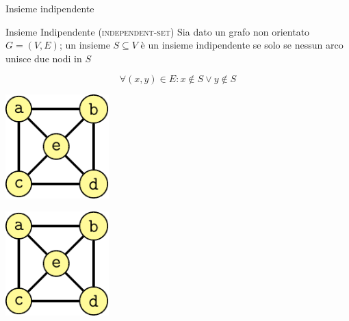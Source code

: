 \begin{frame}{Insieme indipendente}

\vspace{-9pt}
\begin{block}{Insieme Indipendente (\textsc{independent-set})}
Sia dato un grafo non orientato $G=(V,E)$; un insieme
$S \subseteq V$ è un \alert{insieme indipendente} se solo se nessun arco unisce due nodi in $S$

\vspace{-3pt}
\[
\forall (x,y) \in E: x \not \in S \vee y \not \in S
\]
\end{block}

\bigskip
\begin{overprint}
\begin{center}
\includegraphics[width=0.3\textwidth,page=1]{independent.pdf}
\end{center}
\begin{center}
\includegraphics[width=0.3\textwidth,page=2]{independent.pdf}
\end{center}
\end{overprint}

\end{frame}


